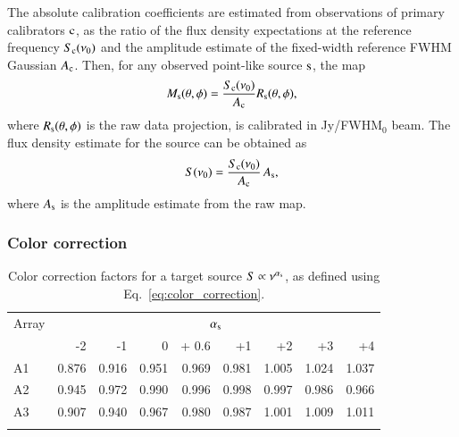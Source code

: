 The absolute calibration coefficients are estimated from observations
of primary calibrators $\rm{c}$, as the ratio of
the flux density expectations at the reference frequency
$S_{\rm{c}}(\nu_0)$ and the amplitude estimate of the fixed-width reference
FWHM Gaussian $A_{\rm{c}}$. Then, for any observed point-like source $\rm{s}$, the map
\begin{equation}
  M_{\rm{s}}(\theta, \phi) = \frac{S_{\rm{c}} (\nu_{0})}{A_{\rm{c}}}
  R_{\rm{s}}(\theta,\phi),
\end{equation}
where $R_{\rm{s}}(\theta,\phi)$ is the raw data projection, is calibrated in Jy/FWHM$_{0}$
beam. The flux density estimate for the
source can be obtained as
\begin{equation}
S(\nu_{0})  = \frac{S_{\rm{c}}(\nu_{0})}{A_{\rm{c}}} \, A_{\rm{s}},
\label{eq:pointsourcephot}
\end{equation}
where $A_{\rm{s}}$ is the amplitude estimate from the raw map.


\subsubsection{Color correction}

\begin{table}[!thbp]
\caption{Color correction factors for a target source  $S \propto \nu^{\alpha_{\rm{s}}}$, as defined using Eq.~\ref{eq:color_correction}.}
\label{tab:mod}
\centering 
\begin{tabular}{lrrrrrrrr}
\hline\hline
\noalign{\smallskip}
Array     & \multicolumn{8}{c}{$\alpha_{\rm{s}}$} \\
\noalign{\smallskip}
\hline
\noalign{\smallskip}
         &  -2 &  -1    &    0  & + 0.6 & +1  &  +2  & +3 & +4  \\       
\noalign{\smallskip}
\hline
\noalign{\smallskip}
          A1   & 0.876  &  0.916   &   0.951  & 0.969 &  0.981   &  1.005  &    1.024  &  1.037   \\
          A2   & 0.945  &  0.972   &   0.990  & 0.996 &  0.998   &  0.997  &    0.986  &  0.966      \\ 
          A3   & 0.907  &  0.940   &   0.967  & 0.980 &  0.987   &  1.001  &    1.009  &  1.011     \\
            \noalign{\smallskip}
            \hline
\end{tabular}
\end{table}

